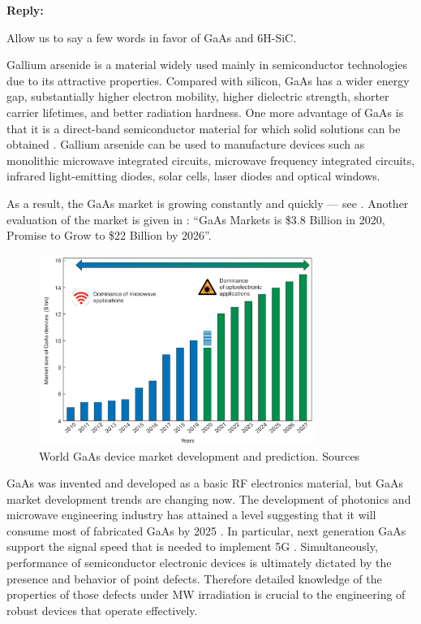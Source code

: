 \documentclass[10pt]{iopart}
\begin{document}
\noindent
\textcolor[rgb]{0.51,0.00,0.00}{\textbf{Reply:}}


Allow us to say a few words  in favor of GaAs and 6H-SiC.


Gallium arsenide is a material widely used mainly in semiconductor technologies
due to its attractive properties.
Compared with silicon, GaAs has a wider energy gap, substantially higher electron
mobility, higher dielectric strength, shorter carrier lifetimes, and better radiation hardness.
One more advantage of GaAs is that it is a direct-band semiconductor material for which solid solutions
can be obtained \cite{GaAs:Papez2021}.
Gallium arsenide can be used to manufacture devices such as monolithic microwave integrated circuits, microwave frequency integrated circuits, infrared light-emitting diodes, solar cells, laser diodes and optical windows.

As a result, the GaAs market is growing constantly and quickly --- see .
Another evaluation of the market is given in \cite{GaAs:MarketAnalys}:
``GaAs Markets is \$3.8 Billion in 2020, Promise to Grow to \$22 Billion by 2026''.


\begin{figure}
\includegraphics[width=0.8\textwidth]{RisRes}
\caption{\label{figRisRes}
World GaAs device market development and prediction.
Sources \cite{GaAs:Kulch2020}
}%
\end{figure}



GaAs was invented and developed as a basic RF electronics material, but GaAs market development trends are changing now.
The development of photonics and microwave engineering industry has attained a level suggesting
that it will consume most of fabricated GaAs by 2025 \cite{GaAs:Kulch2020}.
In particular, next generation GaAs support the signal speed that is needed to implement 5G \cite{GaAs:MarketAnalys}.
Simultaneously, performance of semiconductor electronic devices is ultimately dictated
by the presence and behavior of point defects.
Therefore detailed knowledge of the properties of those defects under MW irradiation
is crucial to the engineering of robust devices that operate effectively.
\end{document}
